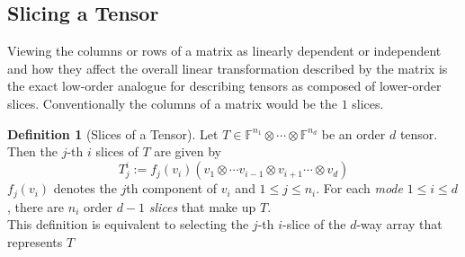 \documentclass[12pt,a4paper,oneside]{book}
\theoremstyle{definition}
\newtheorem{definition}{Definition}[section]
\begin{document}
\subsection{Slicing a Tensor}\label{subsection:tensorslicing}
Viewing the columns or rows of a matrix as linearly dependent or independent and how they affect the overall linear transformation described by the matrix is the exact low-order analogue for describing tensors as composed of lower-order slices. Conventionally the columns of a matrix would be the $1$ slices.
\begin{definition}[Slices of a Tensor]\label{defn:tensorslicing}
    Let $T \in \mathbb{F}^{n_1} \otimes \cdots \otimes \mathbb{F}^{n_d}$ be an order $d$ tensor. Then the $j$-th $i$ slices of $T$ are given by $$T_j^i:= f_j(v_i)(v_1 \otimes \cdots v_{i-1} \otimes v_{i+1} \cdots \otimes v_d)$$ $f_j(v_i)$ denotes the $j$th component of $v_i$ and $1 \leq j \leq n_i$. For each \textit{mode} $1 \leq i \leq d$, there are $n_i$ order $d-1$ \textit{slices} that make up $T$. \\
    This definition is equivalent to selecting the $j$-th $i$-slice of the $d$-way array that represents $T$
\end{definition}
\end{document}
